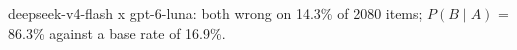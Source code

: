 deepseek-v4-flash x gpt-6-luna: both wrong on 14.3\% of 2080 items; $P(B\mid A)$ = 86.3\% against a base rate of 16.9\%.
